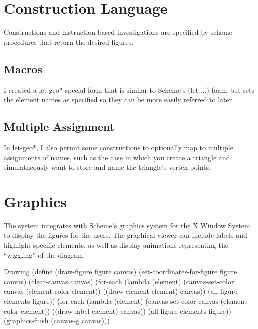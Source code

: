 \section{Construction Language}

Constructions and instruction-based investigations are specified by
scheme procedures that return the desired figures.

\subsection{Macros}

I created a let-geo* special form that is similar to Scheme's (let
...) form, but sets the element names as specified so they can be more
easily referred to later.

\subsection{Multiple Assignment}

In let-geo*, I also permit some constructions to optionally map to
multiple assignments of names, such as the case in which you create a
triangle and simulatneously want to store and name the triangle's
vertex points.

\section{Graphics}

The system integrates with Scheme's graphics system for the X Window
System to display the figures for the users. The graphical viewer can
include labels and highlight specific elements, as well as display
animations representing the ``wiggling'' of the diagram.

\begin{code-listing}{Drawing}
(define (draw-figure figure canvas)
  (set-coordinates-for-figure figure canvas)
  (clear-canvas canvas)
  (for-each
   (lambda (element)
     (canvas-set-color canvas (element-color element))
     ((draw-element element) canvas))
   (all-figure-elements figure))
  (for-each
   (lambda (element)
     (canvas-set-color canvas (element-color element))
     ((draw-label element) canvas))
   (all-figure-elements figure))
  (graphics-flush (canvas-g canvas)))
\end{code-listing}
